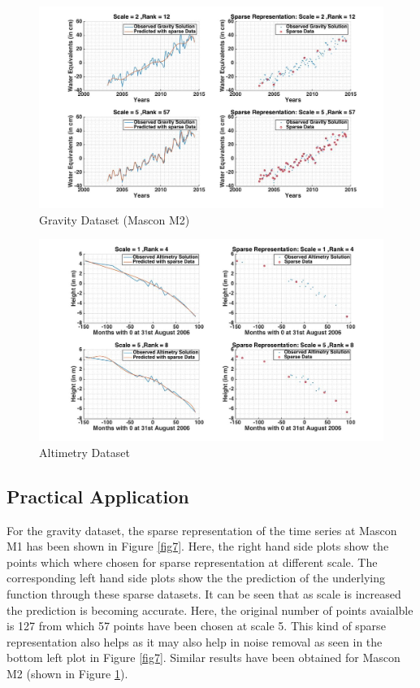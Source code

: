 \documentclass[procedia]{easychair}
\begin{document}
\begin{figure}[]  %
	\centering
	\includegraphics[width=4.5in]{accumulation.jpg}
	\caption[Optional caption]{Gravity Dataset (Mascon M2)}
	\label{fig8} %
\end{figure}




\begin{figure}[]  %
	\centering
	\includegraphics[width=4.5in]{altimtery.jpg}
	\caption[Optional caption]{Altimetry Dataset}
	\label{fig9} %
\end{figure}






\subsection{Practical Application}

For the gravity dataset, the sparse representation of the time series at Mascon M1 has been shown in Figure \ref{fig7}. Here, the right hand side plots show the points which where chosen for sparse representation at different scale. The corresponding left hand side plots show the the prediction of the underlying function through these sparse datasets. It can be seen that as scale is increased the prediction is becoming accurate. Here, the original number of points avaialble is 127 from which 57 points have been chosen at scale 5. This kind of sparse representation also helps as it may also help in noise removal as seen in the bottom left plot in Figure \ref{fig7}. Similar results have been obtained for Mascon M2 (shown in Figure \ref{fig8}).
\end{document}
